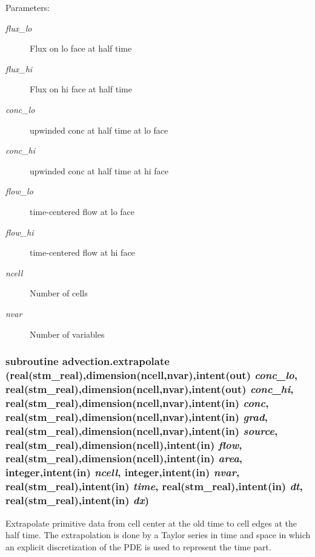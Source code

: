 \begin{Desc}
\item[Parameters:]
\begin{description}
\item[{\em flux\_\-lo}]Flux on lo face at half time\item[{\em flux\_\-hi}]Flux on hi face at half time\item[{\em conc\_\-lo}]upwinded conc at half time at lo face\item[{\em conc\_\-hi}]upwinded conc at half time at hi face\item[{\em flow\_\-lo}]time-centered flow at lo face\item[{\em flow\_\-hi}]time-centered flow at hi face\item[{\em ncell}]Number of cells\item[{\em nvar}]Number of variables \end{description}
\end{Desc}
\hypertarget{a00052_36ba824cb5dc6ca6127866376d2e79ec}{
\subsubsection[{extrapolate}]{\setlength{\rightskip}{0pt plus 5cm}subroutine advection.extrapolate (real(stm\_\-real),dimension(ncell,nvar),intent(out) {\em conc\_\-lo}, \/  real(stm\_\-real),dimension(ncell,nvar),intent(out) {\em conc\_\-hi}, \/  real(stm\_\-real),dimension(ncell,nvar),intent(in) {\em conc}, \/  real(stm\_\-real),dimension(ncell,nvar),intent(in) {\em grad}, \/  real(stm\_\-real),dimension(ncell,nvar),intent(in) {\em source}, \/  real(stm\_\-real),dimension(ncell),intent(in) {\em flow}, \/  real(stm\_\-real),dimension(ncell),intent(in) {\em area}, \/  integer,intent(in) {\em ncell}, \/  integer,intent(in) {\em nvar}, \/  real(stm\_\-real),intent(in) {\em time}, \/  real(stm\_\-real),intent(in) {\em dt}, \/  real(stm\_\-real),intent(in) {\em dx})}}
\label{a00052_36ba824cb5dc6ca6127866376d2e79ec}


Extrapolate primitive data from cell center at the old time to cell edges at the half time. The extrapolation is done by a Taylor series in time and space in which an explicit discretization of the PDE is used to represent the time part. 


